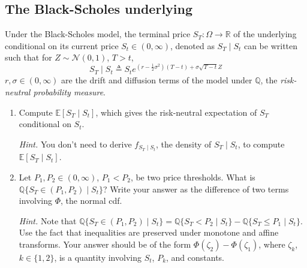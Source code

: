 \documentclass{article}
\numberwithin{equation}{section}
\begin{document}
\subsection{The Black-Scholes underlying}

Under the Black-Scholes model, the terminal price $ S_T : \Omega \rightarrow
\mathbb{R} $ of the underlying conditional on its current price $ S_t \in
(0, \infty) $, denoted as $ S_T \mid S_t $ can be written such that for
$ Z \sim \mathcal{N}(0, 1) $, $ T > t $,
\begin{equation*}
    S_T \mid S_t \triangleq S_te^{
        \left(r - \frac{1}{2}\sigma^2\right)(T - t) + \sigma\sqrt{T - t}Z
    }
\end{equation*}
$ r, \sigma \in (0, \infty) $ are the drift and diffusion terms of the
model under $ \mathbb{Q} $, the \textit{risk-neutral probability
measure}\footnotemark{}.
\begin{enumerate}[label = \alph*.]
    \item
    Compute $ \mathbb{E}[S_T \mid S_t] $, which gives the risk-neutral
    expectation of $ S_T $ conditional on $ S_t $.

    \medskip
    
    \textit{Hint.} You don't need to derive $ f_{S_T \mid S_t} $, the density
    of $ S_T \mid S_t $, to compute $ \mathbb{E}[S_T \mid  S_t] $.

    \item
    Let $ P_1, P_2 \in (0, \infty) $, $ P_1 < P_2 $, be two price thresholds.
    What is $ \mathbb{Q}\{S_T \in (P_1, P_2) \mid S_t\} $? Write your answer
    as the difference of two terms involving $ \Phi $, the normal cdf.

    \medskip

    \textit{Hint.} Note that $ \mathbb{Q}\{S_T \in (P_1, P_2) \mid S_t\} =
    \mathbb{Q}\{S_T < P_2 \mid S_t\} - \mathbb{Q}\{S_T \le P_1 \mid S_t\} $.
    Use the fact that inequalities are preserved under monotone and affine
    transforms. Your answer should be of the form $ \Phi(\zeta_2) -
    \Phi(\zeta_1) $, where $ \zeta_k $, $ k \in \{1, 2\} $, is a quantity
    involving $ S_t $, $ P_k $, and constants.
\end{enumerate}
\end{document}
